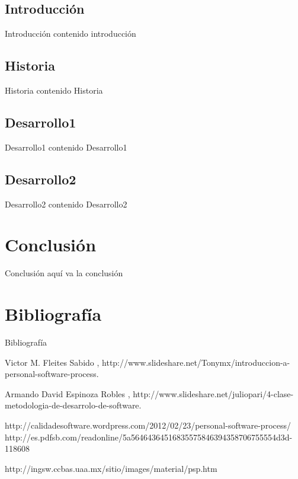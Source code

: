 \documentclass[]{beamer}
\begin{document}
		\subsection{Introducci\'on}
			\begin{frame}{Introducci\'on}
				contenido introducción
			\end{frame}
		
		\subsection{Historia}
			\begin{frame}{Historia}
				contenido Historia
			\end{frame}
			
		\subsection{Desarrollo1}
			\begin{frame}{Desarrollo1}
				contenido Desarrollo1
			\end{frame}

		\subsection{Desarrollo2}
			\begin{frame}{Desarrollo2}
				contenido Desarrollo2
			\end{frame}
			
\section{Conclusi\'on}
	\begin{frame}{Conclusión}
		aqu\'i va la conclusi\'on
	\end{frame}				
			
\section{Bibliograf\'ia}
	\begin{frame}{Bibliograf\'ia}
		\begin{thebibliography}{9}
		
 			Victor M. Fleites Sabido 
 			, 
 			\newblock http://www.slideshare.net/Tonymx/introduccion-a-personal-software-process.
		
 			Armando David Espinoza Robles
 			, 
 			\newblock http://www.slideshare.net/juliopari/4-clase-metodologia-de-desarrolo-de-software.
 			
		http://calidadesoftware.wordpress.com/2012/02/23/personal-software-process/ 			
		http://es.pdfsb.com/readonline/5a56464364516835575846394358706755554d3d-118608
 			
 		http://ingsw.ccbas.uaa.mx/sitio/images/material/psp.htm
		\end{thebibliography}
	\end{frame}
\end{document}
